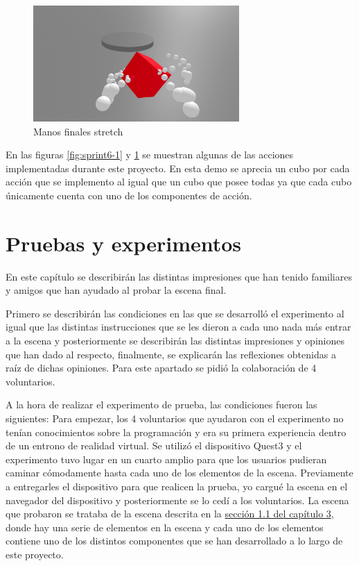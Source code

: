 \documentclass[a4paper, 12pt]{book}
\begin{document}
\begin{figure}[H] 
  \centering
  \includegraphics[width=0.7\textwidth]{img/stretch.jpg} 
  \caption{Manos finales stretch}
  \label{fig:sprint6-2}
\end{figure}

En las figuras \ref{fig:sprint6-1} y \ref{fig:sprint6-2} se muestran algunas de las acciones implementadas durante este proyecto. En esta demo se aprecia un cubo por cada acción que se implemento al igual que un cubo que posee todas ya que cada cubo únicamente cuenta con uno de los componentes de acción.


\cleardoublepage
\chapter{Pruebas y experimentos}
\label{chap:pruebas-experimentos}
En este capítulo se describirán las distintas impresiones que han tenido familiares y amigos que han ayudado al probar la escena final. 

Primero se describirán las condiciones en las que se desarrolló el experimento al igual que las distintas instrucciones que se les dieron a cada uno nada más entrar a la escena y posteriormente se describirán las distintas impresiones y opiniones que han dado al respecto, finalmente, se explicarán las reflexiones obtenidas a raíz de dichas opiniones.
Para este apartado se pidió la colaboración de 4 voluntarios.

A la hora de realizar el experimento de prueba, las condiciones fueron las siguientes: Para empezar, los 4 voluntarios que ayudaron con el experimento no tenían conocimientos sobre la programación y era su primera experiencia dentro de un entrono de realidad virtual. Se utilizó el dispositivo Quest3 y el experimento tuvo lugar en un cuarto amplio para que los usuarios pudieran caminar cómodamente hasta cada uno de los elementos de la escena.
Previamente a entregarles el dispositivo para que realicen la prueba, yo cargué la escena en el navegador del dispositivo y posteriormente se lo cedí a los voluntarios. La escena que probaron se trataba de la escena descrita en la \hyperref[subsec:demo-componentes]{sección 1.1 del capítulo 3}, donde hay una serie de elementos en la escena y cada uno de los elementos contiene uno de los distintos componentes que se han desarrollado a lo largo de este proyecto.
\end{document}

